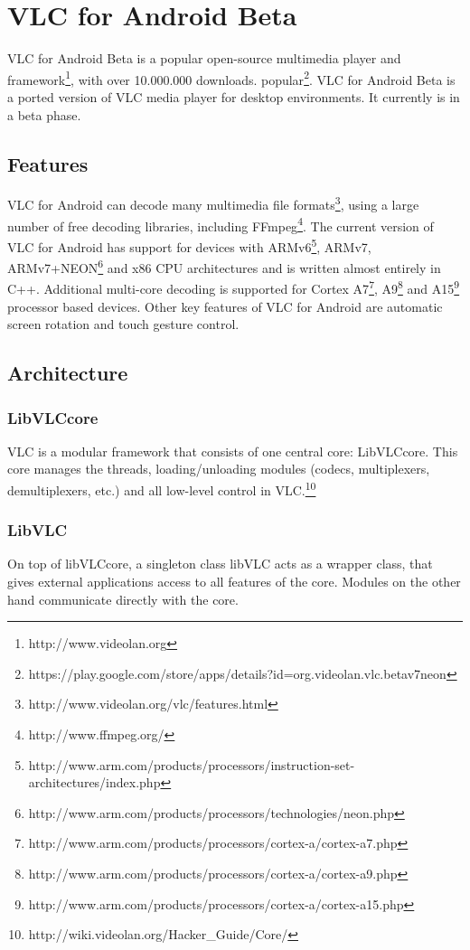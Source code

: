 \section{VLC for Android Beta}
VLC for Android Beta is a popular open-source multimedia player and framework\footnote{http://www.videolan.org}, with over 10.000.000 downloads. popular\footnote{https://play.google.com/store/apps/details?id=org.videolan.vlc.betav7neon}. VLC for Android Beta is a ported version of VLC media player for desktop environments. It currently is in a beta phase.
\subsection{Features}
VLC for Android can decode many multimedia file formats\footnote{http://www.videolan.org/vlc/features.html}, using a large number of free decoding libraries, including FFmpeg\footnote{http://www.ffmpeg.org/}. The current version of VLC for Android has support for devices with ARMv6\footnote{http://www.arm.com/products/processors/instruction-set-architectures/index.php}, ARMv7, ARMv7+NEON\footnote{http://www.arm.com/products/processors/technologies/neon.php} and x86 CPU architectures and is written almost entirely in C++. Additional multi-core decoding is supported for Cortex A7\footnote{http://www.arm.com/products/processors/cortex-a/cortex-a7.php}, A9\footnote{http://www.arm.com/products/processors/cortex-a/cortex-a9.php} and A15\footnote{http://www.arm.com/products/processors/cortex-a/cortex-a15.php} processor based devices. Other key features of VLC for Android are automatic screen rotation and touch gesture control.
\subsection{Architecture}
\subsubsection{LibVLCcore}
VLC is a modular framework that consists of one central core: LibVLCcore. This core manages the threads, loading/unloading modules (codecs, multiplexers, demultiplexers, etc.) and all low-level control in VLC.\footnote{http://wiki.videolan.org/Hacker\_Guide/Core/}
\subsubsection{LibVLC}
On top of libVLCcore, a singleton class libVLC acts as a wrapper class, that gives external applications access to all features of the core. Modules on the other hand communicate directly with the core.
